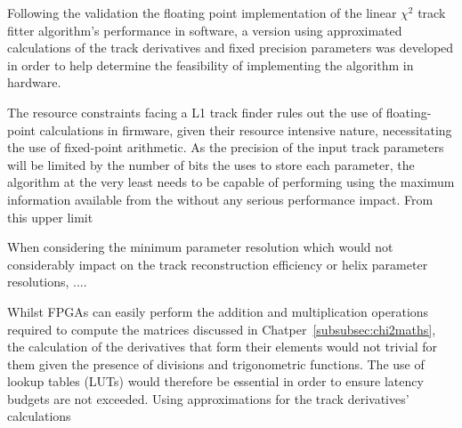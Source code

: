 %

Following the validation the floating point implementation of the linear $\chi^{2}$ track fitter algorithm's performance in software, a version using approximated calculations of the track derivatives and fixed precision parameters was developed in order to help determine the feasibility of implementing the algorithm in hardware.

The resource constraints facing a L1 track finder rules out the use of floating-point calculations in firmware, given their resource intensive nature, necessitating the use of fixed-point arithmetic.
As the precision of the input track parameters will be limited by the number of bits the \HT uses to store each parameter, the algorithm at the very least needs to be capable of performing using the maximum information available from the \HT without any serious performance impact.
From this upper limit


When considering the minimum parameter resolution which would not considerably impact on the track reconstruction efficiency or helix parameter resolutions, .... 



Whilst FPGAs can easily perform the addition and multiplication operations required to compute the matrices discussed in Chatper~\ref{subsubsec:chi2maths}, the calculation of the derivatives that form their elements would not trivial for them given the presence of divisions and trigonometric functions.
The use of lookup tables (LUTs) would therefore be essential in order to ensure latency budgets are not exceeded.
Using approximations for the track derivatives' calculations 

